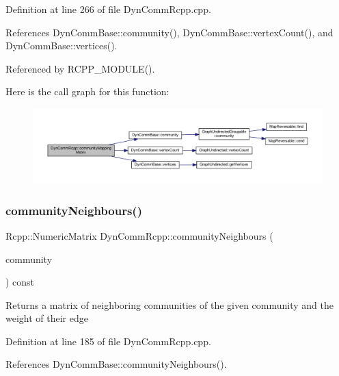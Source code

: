 Definition at line 266 of file Dyn\+Comm\+Rcpp.\+cpp.



References Dyn\+Comm\+Base\+::community(), Dyn\+Comm\+Base\+::vertex\+Count(), and Dyn\+Comm\+Base\+::vertices().



Referenced by R\+C\+P\+P\+\_\+\+M\+O\+D\+U\+L\+E().

Here is the call graph for this function\+:
\nopagebreak
\begin{figure}[H]
\begin{center}
\leavevmode
\includegraphics[width=350pt]{classDynCommRcpp_aaa996ab5e558887d3bc5394af78a2e95_cgraph}
\end{center}
\end{figure}
\mbox{\label{classDynCommRcpp_ad23168e5fa7cf85d5508c646f3e39b9b}} 
\subsubsection{\texorpdfstring{community\+Neighbours()}{communityNeighbours()}}
{\footnotesize\ttfamily Rcpp\+::\+Numeric\+Matrix Dyn\+Comm\+Rcpp\+::community\+Neighbours (\begin{DoxyParamCaption}\item[{\hyperlink{graphUndirectedGroupable_8h_a914da95c9ea7f14f4b7f875c36818556}{type\+Community}}]{community }\end{DoxyParamCaption}) const\hspace{0.3cm}{\ttfamily [inline]}}

\begin{DoxyReturn}{Returns}
a matrix of neighboring communities of the given community and the weight of their edge 
\end{DoxyReturn}


Definition at line 185 of file Dyn\+Comm\+Rcpp.\+cpp.



References Dyn\+Comm\+Base\+::community\+Neighbours().



